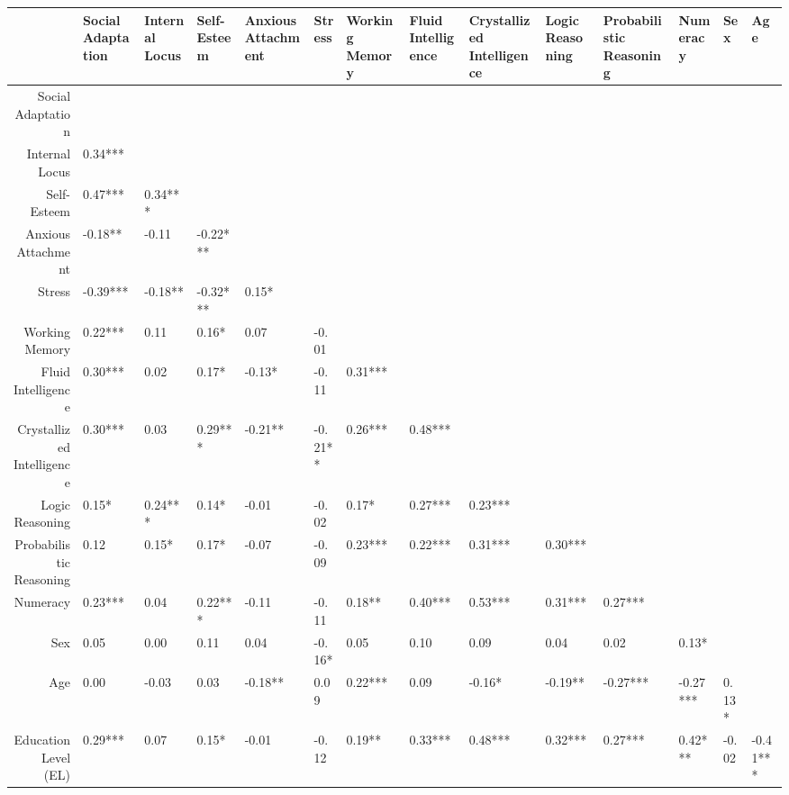 \begin{table}[ht]
\centering
\begin{tabular}{rlllllllllllll}
  \hline
 & Social Adaptation & Internal Locus & Self-Esteem & Anxious Attachment & Stress & Working Memory & Fluid Intelligence & Crystallized Intelligence & Logic Reasoning & Probabilistic Reasoning & Numeracy & Sex & Age \\ 
  \hline
Social Adaptation &  &  &  &  &  &  &  &  &  &  &  &  &  \\ 
  Internal Locus &  0.34***  &  &  &  &  &  &  &  &  &  &  &  &  \\ 
  Self-Esteem &  0.47***  &  0.34***  &  &  &  &  &  &  &  &  &  &  &  \\ 
  Anxious Attachment & -0.18**   & -0.11     & -0.22***  &  &  &  &  &  &  &  &  &  &  \\ 
  Stress & -0.39***  & -0.18**   & -0.32***  &  0.15*    &  &  &  &  &  &  &  &  &  \\ 
  Working Memory &  0.22***  &  0.11     &  0.16*    &  0.07     & -0.01     &  &  &  &  &  &  &  &  \\ 
  Fluid Intelligence &  0.30***  &  0.02     &  0.17*    & -0.13*    & -0.11     &  0.31***  &  &  &  &  &  &  &  \\ 
  Crystallized Intelligence &  0.30***  &  0.03     &  0.29***  & -0.21**   & -0.21**   &  0.26***  &  0.48***  &  &  &  &  &  &  \\ 
  Logic Reasoning &  0.15*    &  0.24***  &  0.14*    & -0.01     & -0.02     &  0.17*    &  0.27***  &  0.23***  &  &  &  &  &  \\ 
  Probabilistic Reasoning &  0.12     &  0.15*    &  0.17*    & -0.07     & -0.09     &  0.23***  &  0.22***  &  0.31***  &  0.30***  &  &  &  &  \\ 
  Numeracy &  0.23***  &  0.04     &  0.22***  & -0.11     & -0.11     &  0.18**   &  0.40***  &  0.53***  &  0.31***  &  0.27***  &  &  &  \\ 
  Sex &  0.05     &  0.00     &  0.11     &  0.04     & -0.16*    &  0.05     &  0.10     &  0.09     &  0.04     &  0.02     &  0.13*    &  &  \\ 
  Age &  0.00     & -0.03     &  0.03     & -0.18**   &  0.09     &  0.22***  &  0.09     & -0.16*    & -0.19**   & -0.27***  & -0.27***  &  0.13*    &  \\ 
  Education Level (EL) &  0.29***  &  0.07     &  0.15*    & -0.01     & -0.12     &  0.19**   &  0.33***  &  0.48***  &  0.32***  &  0.27***  &  0.42***  & -0.02     & -0.41***  \\ 
   \hline
\end{tabular}
\end{table}

